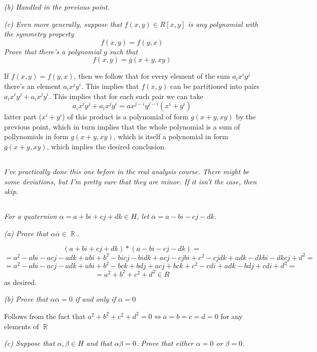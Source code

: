 \documentclass[11pt,oneside,titlepage]{book}
\DeclareMathOperator \real {\mathbb {R}}
\DeclareMathOperator \lra {\Leftrightarrow}
\begin{document}
\textit{(b) Handled in the previous point.}

\textit{(c) Even more generally, suppose that $f(x, y) \in R[x, y]$ is any polynomial
  with the symmetry property
  $$f(x, y) = f(y, x)$$
  Prove that there's a polynomial $g$ such that
  $$f(x, y) = g(x + y, xy)$$}

If $f(x, y) = f(y, x)$, then we follow that for every element of the
sum $a_i x^i y^j$ there's an element $a_i x^j y^i$. This implies that
$f(x, y)$ can be partitioned into pairs $a_i x^i y^j + a_i x^j
y^i$. This implies that for each such pair we can take
$$a_i x^i y^j + a_i x^j y^i = a x^{j - i}y^{j - i}(x^i + y^i)$$
latter part ($x^i + y^i$) of this product is a polynomial of form $g(x
+ y, xy)$ by the previous point, which in turn implies that the whole
polynomial is a sum of pollynomials in form $g(x + y, xy)$, which is
itself a polynomial in form $g(x + y, xy)$, which implies the desired
conclusion.

\subsection{}

\textit{I've practically done this one before in the real analysis
  course. There might be some deviations, but I'm pretty sure that they
  are minor.  If it isn't the case, then skip.}

\subsection{}

\textit{For a quaternion $\alpha = a + bi + cj + dk \in H$, let
  $\overline \alpha = a - bi - cj - dk$. }

\textit{(a) Prove that $\alpha \overline \alpha \in \real$.}

$$(a + bi + cj + dk) * (a - bi - cj - dk) = $$
$$ = 
a^2 - abi - acj - adk + abi + b^2 - bicj - bidk
+ acj - cjbi + c^2 - cjdk + adk - dkbi - dkcj + d^2 = $$
$$ = 
a^2 - abi - acj - adk + abi + b^2 - bck + bdj
+ acj + bck + c^2 - cdi + adk - bdj + cdi + d^2 = $$
$$ =  a^2 + b^2  + c^2 + d^2 \in R$$
as desired.

\textit{(b) Prove that $\alpha \overline \alpha = 0$ if and only if $\alpha = 0$}

Follows from the fact that $a^2 + b^2 + c^2 + d^2 = 0 \lra a = b = c =
d = 0$ for any elements of $\real$

\textit{(c) Suppose that $\alpha, \beta \in H$ and that $\alpha \beta = 0$. Prove that either
  $\alpha = 0$ or $\beta = 0$.}
\end{document}
